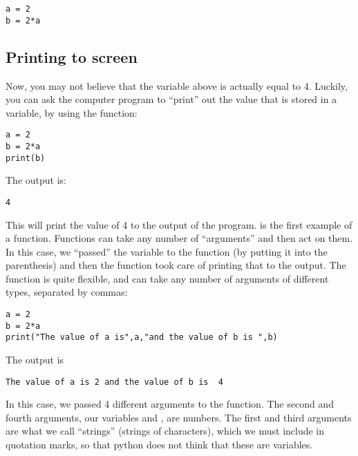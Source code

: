 \begin{lstlisting}[frame=single] 
a = 2 
b = 2*a
\end{lstlisting}

\subsection{Printing to screen}
Now, you may not believe that the variable  above is actually equal to 4. Luckily, you can ask the computer program to ``print'' out the value that is stored in a variable, by using the  function:
\begin{lstlisting}[frame=single] 
a = 2 
b = 2*a
print(b)
\end{lstlisting}
The output is:
\begin{verbatim}
4
\end{verbatim}
This will print the value of 4 to the output of the program.  is the first example of a function. Functions can take any number of ``arguments'' and then act on them. In this case, we ``passed'' the variable  to the function  (by putting it into the parenthesis) and then the function took care of printing that to the output. The  function is quite flexible, and can take any number of arguments of different types, separated by commas:
\begin{lstlisting}[frame=single] 
a = 2 
b = 2*a
print("The value of a is",a,"and the value of b is ",b)
\end{lstlisting}
The output is 
\begin{verbatim}
The value of a is 2 and the value of b is  4
\end{verbatim}
In this case, we passed 4 different arguments to the  function. The second and fourth arguments, our variables  and , are numbers. The first and third arguments are what we call ``strings'' (strings of characters), which we must include in quotation marks, so that python does not think that these are variables.

